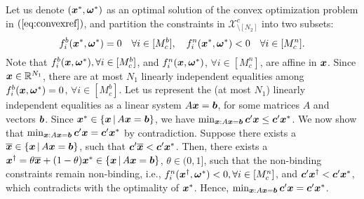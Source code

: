 \documentclass[fleqn,orsc,blindrev]{informs4}
\newcommand{\mb}[1]{\mbox{\boldmath \ensuremath{#1}}}
\begin{document}
\begin{appendices}
{    Let us denote $(\mb{x}^*,\mb{\omega}^*)$ as an optimal solution of the convex optimization problem in $(\ref{eq:convexref})$, and partition the constraints in $\mathcal{X}^{c}_{\setminus [N_2]}$ into two subsets: 
\begin{equation*}
	f_i^b(\mb{x}^*,\mb{\omega}^*) = 0  \quad \forall i\in [M^b_c], \quad f_i^n(\mb{x}^*,\mb{\omega}^*) <0  \quad \forall i\in [M^n_c].
\end{equation*}
	Note that $f_i^b(\mb{x},\mb{\omega}^*), \forall i\in [M^b_c]$, and $f_i^n(\mb{x},\mb{\omega}^*)$,  $\forall i\in [M^n_c]$,  are affine in $\mb{x}$. Since $\mb{x} \in \mathbb{R}^{N_1}$, there are at most $N_1$ linearly independent equalities among $f_i^b(\mb{x},\mb{\omega}^*) = 0$, $\forall i\in [M^b_c]$.  Let us represent the (at most $N_1$) linearly independent equalities as a linear system $A\mb{x} = \mb{b}$, for some matrices $A$ and vectors $\mb{b}$. Since $\mb{x}^* \in \left\{ \mb{x} \,| \, A\mb{x} = \mb{b} \right\}$,  we have $\min_{\boldsymbol{x} : A\boldsymbol{x} = \boldsymbol{b} } \mb{c}'\mb{x} \le \mb{c}'\mb{x}^*$. We now show that $\min_{\boldsymbol{x} : A\boldsymbol{x} = \boldsymbol{b} } \mb{c}'\mb{x} = \mb{c}'\mb{x}^*$ by contradiction.	Suppose there exists a $\overline{\mb{x}} \in \left\{ \mb{x} \,| \, A\mb{x} = \mb{b} \right\}$, such that $\mb{c}'\overline{\mb{x}} < \mb{c}'\mb{x}^*$. Then, there exists a $\mb{x}^{\dagger} = \theta \overline{\mb{x}} +(1- \theta)\mb{x}^* \in \left\{ \mb{x} \,| \, A\mb{x} = \mb{b} \right\}$, $\theta\in (0,1]$, such that the non-binding constraints remain non-binding, i.e., $f_i^n(\mb{x}^{\dagger},\mb{\omega}^*) <0 , \forall i\in [M^n_c]$, and $ \mb{c}'\mb{x}^{\dagger} < \mb{c}'\mb{x}^*$, which contradicts with the optimality of $\mb{x}^*$.  Hence, $\min_{\boldsymbol{x} : A\boldsymbol{x} = \boldsymbol{b} } \mb{c}'\mb{x} = \mb{c}'\mb{x}^*$. 
	
}
\end{appendices}
\end{document}
